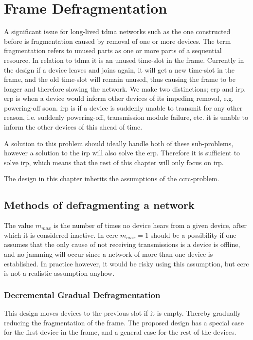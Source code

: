 \section{Frame Defragmentation}
A significant issue for long-lived \gls{tdma} networks such as the one constructed before is fragmentation caused by removal of one or more devices. 
The term fragmentation refers to unused parts as one or more parts of a sequential resource. 
In relation to \gls{tdma} it is an unused time-slot in the frame. 
Currently in the design if a device leaves and joins again, it will get a new time-slot in the frame, and the old time-slot will remain unused, thus causing the frame to be longer and therefore slowing the network.
We make two distinctions; \gls{erp} and \gls{irp}.
\gls{erp} is when a device would inform other devices of its impeding removal, e.g. powering-off soon. 
\gls{irp} is if a device is suddenly unable to transmit for any other reason, i.e. suddenly powering-off, transmission module failure, etc. it is unable to inform the other devices of this ahead of time. 

A solution to this problem should ideally handle both of these sub-problems, however a solution to the \gls{irp} will also solve the \gls{erp}.
Therefore it is sufficient to solve \gls{irp}, which means that the rest of this chapter will only focus on \gls{irp}.  

The design in this chapter inherits the assumptions of the \gls{ccrc}-problem. 

\subsection{Methods of defragmenting a network}

The value $m_{max}$ is the number of times no device hears from a given device, after which it is considered inactive. 
In \gls{ccrc} $m_{max} = 1$ should be a possibility if one assumes that the only cause of not receiving transmissions is a device is offline, and no jamming will occur since a network of more than one device is established.
In practice however, it would be risky using this assumption, but \gls{ccrc} is not a realistic assumption anyhow.

\subsubsection{Decremental Gradual Defragmentation}
This design moves devices to the previous slot if it is empty. 
Thereby gradually reducing the fragmentation of the frame.
The proposed design has a special case for the first device in the frame, and a general case for the rest of the devices.

